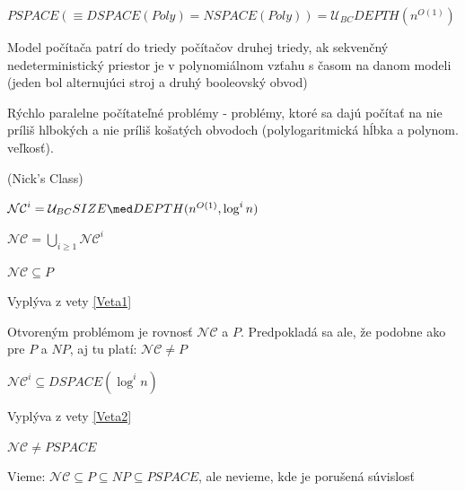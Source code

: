 \begin{dosledok}
$PSPACE(\equiv DSPACE(Poly)=NSPACE(Poly))=\mathcal{U}_{BC}DEPTH(n^{O(1)})$
\end{dosledok}

\begin{definicia}
Model počítača patrí do triedy počítačov druhej triedy, ak sekvenčný nedeterministický
priestor je v polynomiálnom vzťahu s časom na danom modeli (jeden bol alternujúci stroj a
druhý booleovský obvod)
\end{definicia}

Rýchlo paralelne počítateľné problémy - problémy, ktoré sa dajú počítať na nie príliš
hlbokých a nie príliš košatých obvodoch (polylogaritmická hĺbka a polynom. veľkosť).

\begin{definicia}
(Nick's Class)
\begin{description}
\item $\mathcal{NC}^i = \mathcal{U}_{BC}SIZE \med DEPTH(n^{O(1)},\log^in)$
\item $\mathcal{NC} = \underset{i\geq 1}\bigcup \mathcal{NC}^i$
\end{description}
\end{definicia}

\begin{veta}
$\mathcal{NC} \subseteq P $
\end{veta}

\begin{dokaz}
Vyplýva z vety \ref{Veta1}
\end{dokaz}

Otvoreným problémom je rovnosť $\mathcal{NC}$ a $P$. Predpokladá sa ale, že podobne ako
pre $P$ a $NP$, aj tu platí: $\mathcal{NC}\neq P$

\begin{veta}
$\mathcal{NC}^i \subseteq DSPACE(\log^in)$
\end{veta}

\begin{dokaz}
Vyplýva z vety \ref{Veta2}
\end{dokaz}

\begin{dosledok}
$\mathcal{NC} \neq PSPACE$
\end{dosledok}

\begin{poznamka}
Vieme: $\mathcal{NC} \subseteq P \subseteq NP \subseteq PSPACE$, ale nevieme, kde je
porušená súvislosť
\end{poznamka}

